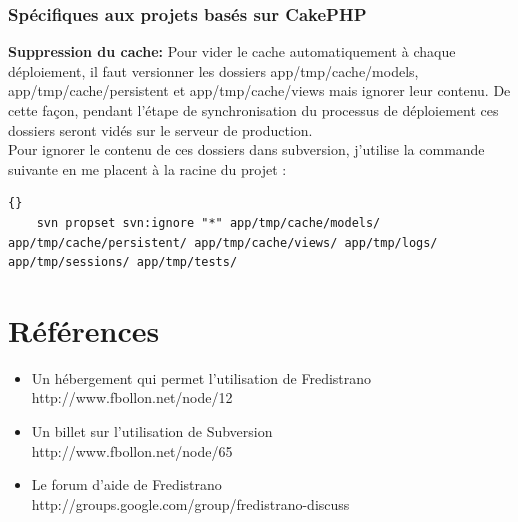 \documentclass[12pt,a4paper]{report}
\begin{document}
\subsection{Spécifiques aux projets basés sur CakePHP} %
\begin{list}{-}{}
	\item \textbf{Suppression du cache:} Pour vider le cache automatiquement à chaque déploiement, il faut versionner les dossiers app/tmp/cache/models, app/tmp/cache/persistent et app/tmp/cache/views mais ignorer leur contenu. De cette façon, pendant l'étape de synchronisation du processus de déploiement ces dossiers seront vidés sur le serveur de production.\\
	Pour ignorer le contenu de ces dossiers dans subversion, j'utilise la commande suivante en me placent à la racine du projet :
	\lstset{language=bash}
	\lstset{breaklines=true}
	\lstset{tabsize=1}
	\begin{lstlisting}[frame=tb]{}
	svn propset svn:ignore "*" app/tmp/cache/models/ app/tmp/cache/persistent/ app/tmp/cache/views/ app/tmp/logs/ app/tmp/sessions/ app/tmp/tests/
	\end{lstlisting}
\end{list}

\chapter{Références}
\begin{itemize}
\item Un hébergement qui permet l'utilisation de Fredistrano \\ http://www.fbollon.net/node/12 \\
\item Un billet sur l'utilisation de Subversion \\ http://www.fbollon.net/node/65 \\
\item Le forum d'aide de Fredistrano \\ http://groups.google.com/group/fredistrano-discuss
\end{itemize}
\end{document}
